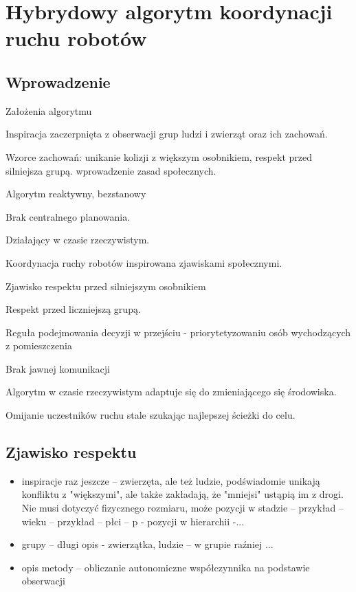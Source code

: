 \chapter{Hybrydowy algorytm koordynacji ruchu robotów}

\section{Wprowadzenie} 

Założenia algorytmu

Inspiracja zaczerpnięta z obserwacji grup ludzi i zwierząt oraz ich zachowań.

Wzorce zachowań: 
unikanie kolizji z większym osobnikiem, respekt przed silniejsza grupą.
wprowadzenie zasad społecznych.

Algorytm reaktywny, bezstanowy 

Brak centralnego planowania.

Działający w czasie rzeczywistym.

Koordynacja ruchy robotów inspirowana zjawiskami społecznymi.

Zjawisko respektu przed silniejszym osobnikiem 

Respekt przed liczniejszą grupą.

Reguła podejmowania decyzji w przejściu - priorytetyzowaniu osób wychodzących z pomieszczenia 


Brak jawnej komunikacji 

Algorytm w czasie rzeczywistym adaptuje się do zmieniającego się środowiska.

Omijanie uczestników ruchu stale szukając najlepszej ścieżki do celu.

\section{Zjawisko respektu}

 \begin{itemize}
 \item inspiracje raz jeszcze -- zwierzęta, ale też ludzie, podświadomie unikają konfliktu z "większymi", ale także zakładają, że "mniejsi" ustąpią im z drogi. Nie musi dotyczyć fizycznego rozmiaru, może pozycji w stadzie -- przykład -- wieku --  przykład -- płci -- p - pozycji w hierarchii -... 
 \item grupy -- długi opis - zwierzątka, ludzie -- w grupie raźniej ... 

 \item opis metody -- obliczanie autonomiczne współczynnika na podstawie obserwacji

 \end{itemize}

